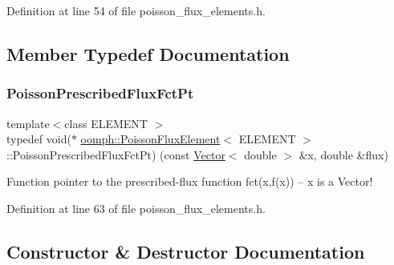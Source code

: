 Definition at line 54 of file poisson\+\_\+flux\+\_\+elements.\+h.



\subsection{Member Typedef Documentation}
\mbox{\label{classoomph_1_1PoissonFluxElement_a667254e1d7fea39ba393e0d9853f216d}} 
\subsubsection{\texorpdfstring{Poisson\+Prescribed\+Flux\+Fct\+Pt}{PoissonPrescribedFluxFctPt}}
{\footnotesize\ttfamily template$<$class E\+L\+E\+M\+E\+NT $>$ \\
typedef void($\ast$ \hyperlink{classoomph_1_1PoissonFluxElement}{oomph\+::\+Poisson\+Flux\+Element}$<$ E\+L\+E\+M\+E\+NT $>$\+::Poisson\+Prescribed\+Flux\+Fct\+Pt) (const \hyperlink{classoomph_1_1Vector}{Vector}$<$ double $>$ \&x, double \&flux)}



Function pointer to the prescribed-\/flux function fct(x,f(x)) -- x is a Vector! 



Definition at line 63 of file poisson\+\_\+flux\+\_\+elements.\+h.



\subsection{Constructor \& Destructor Documentation}
\mbox{\label{classoomph_1_1PoissonFluxElement_a484772fcf9b2488d6c8e6d8d0c1c95db}} 
